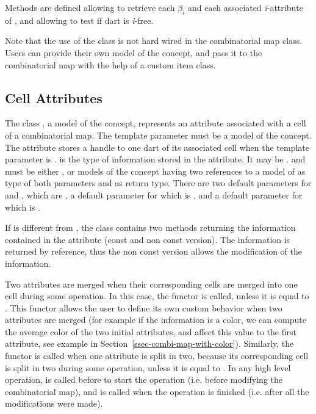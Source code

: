 Methods are defined allowing to retrieve each $\beta_i$ and each
associated \emph{i}-attribute of , and allowing to test if 
dart is \emph{i}-free.

Note that the use of the  class is not hard wired in
the combinatorial map class. Users can provide their own model of the
 concept, and pass it to the combinatorial map with the help
of a custom item class.

\subsection{Cell Attributes}\label{ssec-attributes}

The class , a
model of the  concept, represents an attribute
associated with a cell of a combinatorial map.  The 
template parameter  must be a model of the
 concept.  The attribute stores a handle to one
dart of its associated cell when the template parameter  is
.
 is the type of information stored in the attribute. It may
be .   and  must be either
, or models of the  concept
having two references to a model of  as type of
both parameters and  as return type.  There are two default
parameters for  and , which are
, a default parameter for  which is
, and a default parameter for  which is
.

If  is different from , the class
 contains two methods  returning the
information contained in the attribute (const and non const version).
The information is returned by reference, thus the non const version
allows the modification of the information.

Two attributes are merged when their corresponding cells are merged
into one cell during some operation. In this case, the functor
 is called, unless it is equal to .
This functor allows the user to define its own custom behavior when
two attributes are merged (for example if the information is a color,
we can compute the average color of the two initial attributes, and
affect this value to the first attribute, see example in
Section~\ref{ssec-combi-map-with-color}).  Similarly, the functor
 is called when one attribute is split in two, because
its corresponding cell is split in two during some operation, unless
it is equal to .  In any high level operation,
 is called before to start the operation (i.e. before
modifying the combinatorial map), and  is called when the
operation is finished (i.e. after all the modifications were made).

